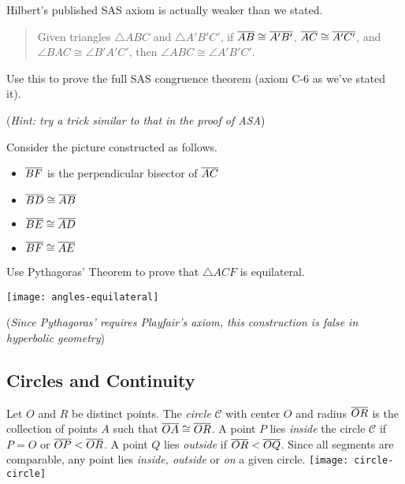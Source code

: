 \begin{exercises}
\begin{enumerate}
  \item\label{exs:hilbertsas} Hilbert's published SAS axiom is actually weaker than we stated.
	\begin{quote}
		Given triangles $\triangle ABC$ and $\triangle A'B'C'$, if $\overline{AB}\cong\overline{A'B'}$, $\overline{AC}\cong\overline{A'C'}$, and $\angle BAC\cong\angle B'A'C'$, then $\angle ABC\cong\angle A'B'C'$. 
	\end{quote}
	Use this to prove the full SAS congruence theorem (axiom C-6 as we've stated it).\par
	(\emph{Hint: try a trick similar to that in the proof of ASA})
	
	\begin{minipage}[t]{0.65\linewidth}\vspace{0pt}
  \item\label{ex:pythagnocont} Consider the picture constructed as follows.
  \begin{itemize}\itemsep0pt
    \item $\overline{BF}$ is the perpendicular bisector of $\overline{AC}$
    \item $\overline{BD}\cong\overline{AB}$
    \item $\overline{BE}\cong\overline{AD}$
    \item $\overline{BF}\cong\overline{AE}$
  \end{itemize}
  Use Pythagoras' Theorem to prove that $\triangle ACF$ is equilateral.
  \end{minipage}\begin{minipage}[t]{0.35\linewidth}\vspace{-5pt}
  \flushright\texttt{[image: angles-equilateral]}
  \end{minipage}\smallbreak
  (\emph{Since Pythagoras' requires Playfair's axiom, this construction is false in hyperbolic geometry})
\end{enumerate}
\end{exercises}


\clearpage

\subsection{Circles and Continuity}\label{sec:circ}

\begin{defn}[lower separated=false, sidebyside, sidebyside align=top seam, sidebyside gap=0pt, righthand width=0.22\linewidth]{}{}
Let $O$ and $R$ be distinct points. The \emph{circle} $\mathcal C$ with center $O$ and radius $\overline{OR}$ is the collection of points $A$ such that $\overline{OA}\cong\overline{OR}$.\smallbreak
A point $P$ lies \emph{inside} the circle $\mathcal C$ if $P=O$ or $\overline{OP}<\overline{OR}$.\smallbreak
A point $Q$ lies \emph{outside} if $\overline{OR}<\overline{OQ}$.\smallbreak
Since all segments are comparable, any point lies \emph{inside, outside} or \emph{on} a given circle.
\tcblower
\flushright\texttt{[image: circle-circle]}
\end{defn}

